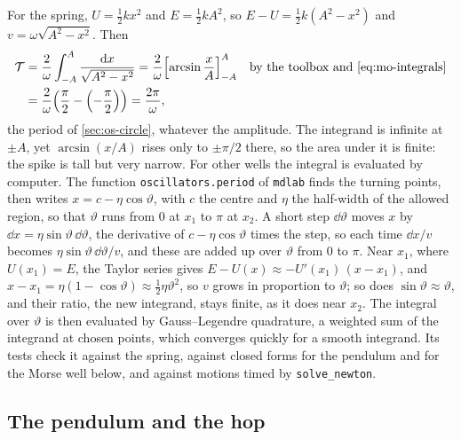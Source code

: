 For the spring, $U = \frac12 kx^2$ and $E = \frac12 kA^2$, so $E - U =
\frac12 k(A^2 - x^2)$ and $v = \omega\sqrt{A^2 - x^2}$. Then
\begin{align*}
   \mathcal{T} &= \frac{2}{\omega}\int_{-A}^{A}\frac{\dd x}{\sqrt{A^2 - x^2}}
   = \frac{2}{\omega}\Bigl[\arcsin\frac{x}{A}\Bigr]_{-A}^{A}
      && \text{by the toolbox and \cref{eq:mo-integrals}}\\
   &= \frac{2}{\omega}\Bigl(\frac{\pi}{2} - \Bigl(-\frac{\pi}{2}\Bigr)\Bigr)
   = \frac{2\pi}{\omega} ,
\end{align*}
the period of \cref{sec:os-circle}, whatever the amplitude. The integrand
is infinite at $\pm A$, yet $\arcsin(x/A)$ rises only to $\pm\pi/2$ there,
so the area under it is finite: the spike is tall but very narrow. For
other wells the integral is evaluated by computer. The function
\texttt{oscillators.period} of \texttt{mdlab} finds the turning points,
then writes $x = c - \eta\cos\vartheta$, with $c$ the centre and $\eta$ the
half-width of the allowed region, so that $\vartheta$ runs from 0 at
$x_1$ to $\pi$ at $x_2$. A short step $\dd\vartheta$ moves $x$ by $\dd x =
\eta\sin\vartheta\,\dd\vartheta$, the derivative of $c - \eta\cos\vartheta$
times the step, so each time $\dd x/v$ becomes $\eta\sin\vartheta\,
\dd\vartheta/v$, and these are added up over $\vartheta$ from 0 to $\pi$.
Near $x_1$, where $U(x_1) = E$, the Taylor series gives $E - U(x) \approx
-U'(x_1)\,(x - x_1)$, and $x - x_1 = \eta(1 - \cos\vartheta) \approx \frac12
\eta\vartheta^2$, so $v$ grows in proportion to $\vartheta$; so does
$\sin\vartheta \approx \vartheta$, and their ratio, the new integrand,
stays finite, as it does near $x_2$. The integral over $\vartheta$ is
then evaluated by Gauss--Legendre quadrature, a weighted sum of the
integrand at chosen points, which converges quickly for a smooth
integrand. Its tests check it against the spring, against closed
forms for the pendulum and for the Morse well below, and against motions
timed by \texttt{solve\_newton}.

\subsection*{The pendulum and the hop}

